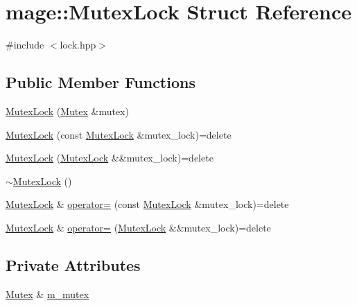 \hypertarget{structmage_1_1_mutex_lock}{}\section{mage\+:\+:Mutex\+Lock Struct Reference}
\label{structmage_1_1_mutex_lock}


{\ttfamily \#include $<$lock.\+hpp$>$}

\subsection*{Public Member Functions}
\begin{DoxyCompactItemize}
\item 
\hyperlink{structmage_1_1_mutex_lock_aa8cd93677eec2656ca217fdf79f911c4}{Mutex\+Lock} (\hyperlink{structmage_1_1_mutex}{Mutex} \&mutex)
\item 
\hyperlink{structmage_1_1_mutex_lock_a20b0f44c31bcb2040cbf23f071870af9}{Mutex\+Lock} (const \hyperlink{structmage_1_1_mutex_lock}{Mutex\+Lock} \&mutex\+\_\+lock)=delete
\item 
\hyperlink{structmage_1_1_mutex_lock_a5045ffd6d3743b7994ba2ddfaf093a4a}{Mutex\+Lock} (\hyperlink{structmage_1_1_mutex_lock}{Mutex\+Lock} \&\&mutex\+\_\+lock)=delete
\item 
\hyperlink{structmage_1_1_mutex_lock_a2631e8878646b2d25b136b6adb55d553}{$\sim$\+Mutex\+Lock} ()
\item 
\hyperlink{structmage_1_1_mutex_lock}{Mutex\+Lock} \& \hyperlink{structmage_1_1_mutex_lock_a739909161a9a9ca0fc8143ac84967765}{operator=} (const \hyperlink{structmage_1_1_mutex_lock}{Mutex\+Lock} \&mutex\+\_\+lock)=delete
\item 
\hyperlink{structmage_1_1_mutex_lock}{Mutex\+Lock} \& \hyperlink{structmage_1_1_mutex_lock_a189a5b4efe2831352b13bd30b80ea47d}{operator=} (\hyperlink{structmage_1_1_mutex_lock}{Mutex\+Lock} \&\&mutex\+\_\+lock)=delete
\end{DoxyCompactItemize}
\subsection*{Private Attributes}
\begin{DoxyCompactItemize}
\item 
\hyperlink{structmage_1_1_mutex}{Mutex} \& \hyperlink{structmage_1_1_mutex_lock_a1c796e1e66bd49007fe746d1425b82f4}{m\+\_\+mutex}
\end{DoxyCompactItemize}


